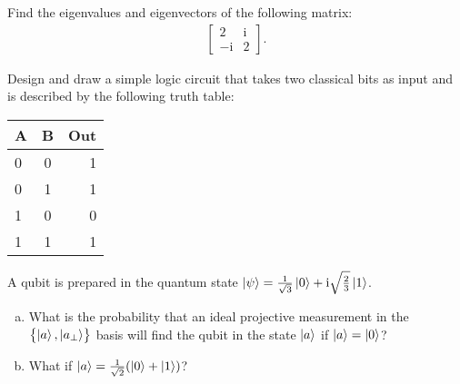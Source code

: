 \documentclass[11pt,letter]{article}
\newcommand{\mathi}{\mathrm{i}}
\begin{document}
\maketitle
\thispagestyle{fancytitle}
\tabulateAcks


\begin{problem}
  Find the eigenvalues and eigenvectors of the following matrix:
  \begin{align*}
    \begin{bmatrix} 2 & \mathi \\ -\mathi & 2 \end{bmatrix}.
  \end{align*}
\end{problem}

\begin{solution}

\end{solution}

\pagebreak %

\begin{problem}
  Design and draw a simple logic circuit that takes two classical bits as input
  and is described by the following truth table:
  \begin{table}[H]
    \centering
    \begin{tabular}{l c || r}
    A & B & Out \\
    \hline
    0 & 0 & 1 \\
    0 & 1 & 1 \\
    1 & 0 & 0 \\
    1 & 1 & 1
  \end{tabular}
\end{table}

\end{problem}

\begin{solution}

\end{solution}

\pagebreak %

\begin{problem}
    A qubit is prepared in the quantum state $\ket{\psi} =
    \frac{1}{\sqrt{3}}\ket{0} + \mathi\sqrt{\frac{2}{3}}\ket{1}$.
  \begin{enumerate}[(a)]
  \item What is the probability that an ideal projective measurement in the
    $\cbr{\ket{a},\ket{a_{\perp}}}$ basis will find the qubit in the state
    $\ket{a}$ if $\ket{a} = \ket{0}$?
  \item What if $\ket{a} = \frac{1}{\sqrt{2}}(\ket{0}+\ket{1})$?
  \end{enumerate}
\end{problem}
\end{document}
